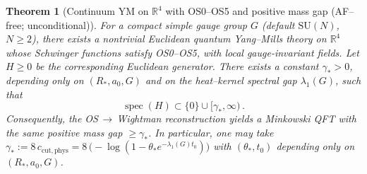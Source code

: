 \documentclass[11pt]{amsart}
\theoremstyle{plain}
\newtheorem{theorem}{Theorem}[section]
\theoremstyle{definition}
\theoremstyle{remark}
\begin{document}
\begin{theorem}[Continuum YM on $\mathbb R^4$ with OS0--OS5 and positive mass gap (AF--free; unconditional)]\label{thm:main-af-free}
For a compact simple gauge group $G$ (default $\mathrm{SU}(N)$, $N\ge 2$), there exists a nontrivial Euclidean quantum Yang--Mills theory on $\mathbb R^4$ whose Schwinger functions satisfy OS0--OS5, with local gauge-invariant fields. Let $H\ge 0$ be the corresponding Euclidean generator. There exists a constant $\gamma_*>0$, depending only on $(R_*,a_0,G)$ and on the heat--kernel spectral gap $\lambda_1(G)$, such that
\[
  \operatorname{spec}(H)\subset\{0\}\cup[\gamma_*,\infty)\,.
\]
Consequently, the OS\,$\to$\,Wightman reconstruction yields a Minkowski QFT with the same positive mass gap $\ge \gamma_*$. In particular, one may take $\gamma_* := 8\,c_{\mathrm{cut,phys}} = 8\,\big(-\log(1-\theta_* e^{-\lambda_1(G) t_0})\big)$ with $(\theta_*,t_0)$ depending only on $(R_*,a_0,G)$.
\end{theorem}
\end{document}
